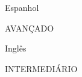 

\begin{cventries}

  \cventry
    {} %
    {Espanhol} %
    {} %
    {} %
    {
      \begin{cvitems} %
        \item{AVANÇADO}
      \end{cvitems}
    }

  \cventry
    {} %
    {Inglês} %
    {} %
    {} %
    {
      \begin{cvitems} %
        \item{INTERMEDIÁRIO}
      \end{cvitems}
    }

\end{cventries}
